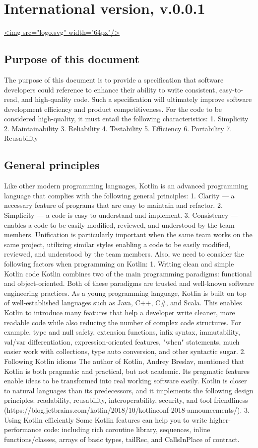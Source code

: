 \section*{International version, v.0.0.1}
\hspace{0.0cm}\hyperref[sec:]{<img src="logo.svg" width="64px"/>}
\subsection*{\textbf{Purpose of this document}}
\label{sec:}
The purpose of this document is to provide a specification that software developers could reference to enhance their ability to write consistent, easy-to-read, and high-quality code.
Such a specification will ultimately improve software development efficiency and product competitiveness.
For the code to be considered high-quality, it must entail the following characteristics:
1.	Simplicity
2.	Maintainability
3.	Reliability
4.	Testability
5.	Efficiency
6.	Portability
7.	Reusability
\subsection*{\textbf{General principles}}
Like other modern programming languages, Kotlin is an advanced programming language that complies with the following general principles:
1.	Clarity — a necessary feature of programs that are easy to maintain and refactor.
2.	Simplicity — a code is easy to understand and implement.
3.	Consistency — enables a code to be easily modified, reviewed, and understood by the team members. Unification is particularly important when the same team works on the same project, utilizing similar styles enabling a code to be easily modified, reviewed, and understood by the team members.
Also, we need to consider the following factors when programming on Kotlin:
1. Writing clean and simple Kotlin code
    Kotlin combines two of the main programming paradigms: functional and object-oriented.
    Both of these paradigms are trusted and well-known software engineering practices.
    As a young programming language, Kotlin is built on top of well-established languages such as Java, C++, C\#, and Scala.
    This enables Kotlin to introduce many features that help a developer write cleaner, more readable code while also reducing the number of complex code structures. For example, type and null safety, extension functions, infix syntax, immutability, val/var differentiation, expression-oriented features, "when" statements, much easier work with collections, type auto conversion, and other syntactic sugar.
2. Following Kotlin idioms
    The author of Kotlin, Andrey Breslav, mentioned that Kotlin is both pragmatic and practical, but not academic.
    Its pragmatic features enable ideas to be transformed into real working software easily. Kotlin is closer to natural languages than its predecessors, and it implements the following design principles: readability, reusability, interoperability, security, and tool-friendliness (https://blog.jetbrains.com/kotlin/2018/10/kotlinconf-2018-announcements/).
3. Using Kotlin efficiently
    Some Kotlin features can help you to write higher-performance code: including rich coroutine library, sequences, inline functions/classes, arrays of basic types, tailRec, and CallsInPlace of contract.
